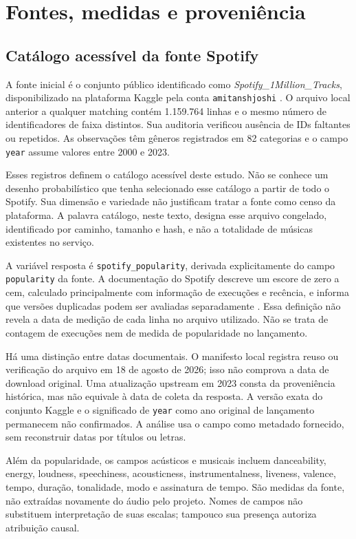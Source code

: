 \chapter{Fontes, medidas e proveniência}\label{cap:fontes}
\section{Catálogo acessível da fonte Spotify}
A fonte inicial é o conjunto público identificado como \emph{Spotify\_1Million\_Tracks}, disponibilizado na plataforma Kaggle pela conta \texttt{amitanshjoshi} \citep{spotifydataset}. O arquivo local anterior a qualquer matching contém 1.159.764 linhas e o mesmo número de identificadores de faixa distintos. Sua auditoria verificou ausência de IDs faltantes ou repetidos. As observações têm gêneros registrados em 82 categorias e o campo \texttt{year} assume valores entre 2000 e 2023.

Esses registros definem o catálogo acessível deste estudo. Não se conhece um desenho probabilístico que tenha selecionado esse catálogo a partir de todo o Spotify. Sua dimensão e variedade não justificam tratar a fonte como censo da plataforma. A palavra catálogo, neste texto, designa esse arquivo congelado, identificado por caminho, tamanho e hash, e não a totalidade de músicas existentes no serviço.

A variável resposta é \texttt{spotify\_popularity}, derivada explicitamente do campo \texttt{popularity} da fonte. A documentação do Spotify descreve um escore de zero a cem, calculado principalmente com informação de execuções e recência, e informa que versões duplicadas podem ser avaliadas separadamente \citep{spotifydocs}. Essa definição não revela a data de medição de cada linha no arquivo utilizado. Não se trata de contagem de execuções nem de medida de popularidade no lançamento.

Há uma distinção entre datas documentais. O manifesto local registra reuso ou verificação do arquivo em 18 de agosto de 2026; isso não comprova a data de download original. Uma atualização upstream em 2023 consta da proveniência histórica, mas não equivale à data de coleta da resposta. A versão exata do conjunto Kaggle e o significado de \texttt{year} como ano original de lançamento permanecem não confirmados. A análise usa o campo como metadado fornecido, sem reconstruir datas por títulos ou letras.

Além da popularidade, os campos acústicos e musicais incluem danceability, energy, loudness, speechiness, acousticness, instrumentalness, liveness, valence, tempo, duração, tonalidade, modo e assinatura de tempo. São medidas da fonte, não extraídas novamente do áudio pelo projeto. Nomes de campos não substituem interpretação de suas escalas; tampouco sua presença autoriza atribuição causal.

